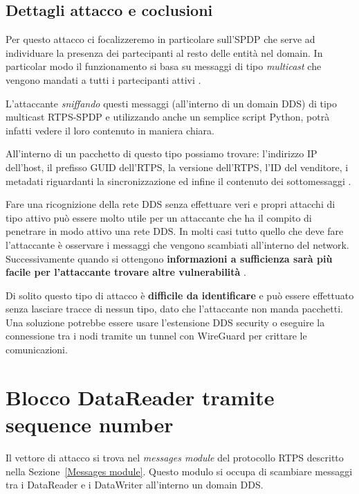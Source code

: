 \subsection{Dettagli attacco e coclusioni}
Per questo attacco ci focalizzeremo in particolare sull'SPDP che serve ad
individuare la presenza dei partecipanti al resto delle
entità nel domain. In particolar modo
il funzionamento si basa su messaggi di tipo \textit{multicast} che vengono
mandati a tutti i partecipanti attivi
\cite{ddsrtps}.

L'attaccante \textit{sniffando} questi messaggi (all'interno di un domain DDS)
di tipo multicast RTPS-SPDP e
utilizzando anche un semplice script Python, potrà infatti 
vedere il loro contenuto in maniera chiara.

All'interno di un pacchetto di questo tipo possiamo trovare:
l'indirizzo IP dell'host, il prefisso GUID dell'RTPS,
la versione dell'RTPS, l'ID del venditore, i metadati 
riguardanti la sincronizzazione
ed infine il contenuto dei sottomessaggi \cite{White2017AnII}.


Fare una ricognizione della rete DDS senza effettuare veri e propri
attacchi di tipo attivo può essere molto utile per un attaccante che 
ha il compito di penetrare in modo attivo
una rete DDS. In molti casi tutto quello che deve fare l'attaccante
è osservare i messaggi che vengono scambiati all'interno del network.
Successivamente quando si ottengono \textbf{informazioni 
a sufficienza sarà più
facile per l'attaccante trovare altre vulnerabilità}
\cite{White2017AnII}.

Di solito questo tipo di attacco è \textbf{difficile da identificare} 
e può essere
effettuato senza lasciare tracce di nessun tipo, dato che l'attaccante non 
manda pacchetti.
Una soluzione potrebbe essere usare l'estensione DDS security o 
eseguire la connessione tra i nodi tramite un tunnel con WireGuard per crittare
le comunicazioni.



\section{Blocco DataReader tramite sequence number}

Il vettore di attacco si trova nel \textit{messages module} del protocollo RTPS
descritto nella Sezione~\ref{Messages module}. Questo modulo
si occupa di scambiare messaggi tra i DataReader e i DataWriter 
all'interno un domain DDS.

